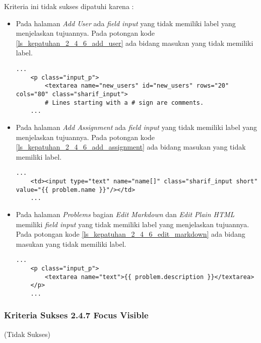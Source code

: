 Kriteria ini tidak sukses dipatuhi karena :
\begin{itemize}
	\item Pada halaman \textit{Add User} ada \textit{field input} yang tidak memiliki label yang menjelaskan tujuannya. Pada potongan kode \ref{ls_kepatuhan_2_4_6_add_user} ada bidang masukan yang tidak memiliki label.
	\begin{lstlisting}[basicstyle=\ttfamily, frame=single,
	columns=fullflexible, keepspaces=true, breaklines=true, label=ls_kepatuhan_2_4_6_add_user, caption=Kriteria Sukses 2.4.6 - Halaman \textit{Add User}]
	...
	<p class="input_p">
		<textarea name="new_users" id="new_users" rows="20" cols="80" class="sharif_input">
		# Lines starting with a # sign are comments.
	...
	\end{lstlisting}
	
	\item Pada halaman \textit{Add Assignment} ada \textit{field input} yang tidak memiliki label yang menjelaskan tujuannya. Pada potongan kode \ref{ls_kepatuhan_2_4_6_add_assignment} ada bidang masukan yang tidak memiliki label.
	\begin{lstlisting}[basicstyle=\ttfamily, frame=single,
	columns=fullflexible, keepspaces=true, breaklines=true, label=ls_kepatuhan_2_4_6_add_assignment, caption=Kriteria Sukses 2.4.6 - Halaman \textit{Add Assignment}]
	...
	<td><input type="text" name="name[]" class="sharif_input short" value="{{ problem.name }}"/></td>
	...
	\end{lstlisting}
	
	\item Pada halaman \textit{Problems} bagian \textit{Edit Markdown} dan \textit{Edit Plain HTML} memiliki \textit{field input} yang tidak memiliki label yang menjelaskan tujuannya. Pada potongan kode \ref{ls_kepatuhan_2_4_6_edit_markdown} ada bidang masukan yang tidak memiliki label.
	\begin{lstlisting}[basicstyle=\ttfamily, frame=single,
	columns=fullflexible, keepspaces=true, breaklines=true, label=ls_kepatuhan_2_4_6_edit_markdown, caption=Kriteria Sukses 2.4.6 - Halaman \textit{Problems} bagian \textit{Edit Markdown}]
	...
	<p class="input_p">
		<textarea name="text">{{ problem.description }}</textarea>
	</p>
	...
	\end{lstlisting}
	
\end{itemize}

\subsubsection{Kriteria Sukses 2.4.7 Focus Visible}
\label{subsubsec:kepatuhan_kriteria_2.4.7}
(Tidak Sukses) \\


